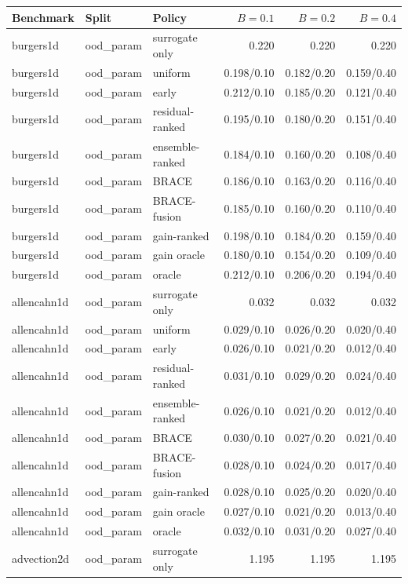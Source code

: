 \begin{tabular}{lllrrr}
\toprule
Benchmark & Split & Policy & $B=0.1$ & $B=0.2$ & $B=0.4$ \\
\midrule
burgers1d & ood\_param & surrogate only & 0.220 & 0.220 & 0.220 \\
burgers1d & ood\_param & uniform & 0.198/0.10 & 0.182/0.20 & 0.159/0.40 \\
burgers1d & ood\_param & early & 0.212/0.10 & 0.185/0.20 & 0.121/0.40 \\
burgers1d & ood\_param & residual-ranked & 0.195/0.10 & 0.180/0.20 & 0.151/0.40 \\
burgers1d & ood\_param & ensemble-ranked & 0.184/0.10 & 0.160/0.20 & 0.108/0.40 \\
burgers1d & ood\_param & BRACE & 0.186/0.10 & 0.163/0.20 & 0.116/0.40 \\
burgers1d & ood\_param & BRACE-fusion & 0.185/0.10 & 0.160/0.20 & 0.110/0.40 \\
burgers1d & ood\_param & gain-ranked & 0.198/0.10 & 0.184/0.20 & 0.159/0.40 \\
burgers1d & ood\_param & gain oracle & 0.180/0.10 & 0.154/0.20 & 0.109/0.40 \\
burgers1d & ood\_param & oracle & 0.212/0.10 & 0.206/0.20 & 0.194/0.40 \\
\midrule
allencahn1d & ood\_param & surrogate only & 0.032 & 0.032 & 0.032 \\
allencahn1d & ood\_param & uniform & 0.029/0.10 & 0.026/0.20 & 0.020/0.40 \\
allencahn1d & ood\_param & early & 0.026/0.10 & 0.021/0.20 & 0.012/0.40 \\
allencahn1d & ood\_param & residual-ranked & 0.031/0.10 & 0.029/0.20 & 0.024/0.40 \\
allencahn1d & ood\_param & ensemble-ranked & 0.026/0.10 & 0.021/0.20 & 0.012/0.40 \\
allencahn1d & ood\_param & BRACE & 0.030/0.10 & 0.027/0.20 & 0.021/0.40 \\
allencahn1d & ood\_param & BRACE-fusion & 0.028/0.10 & 0.024/0.20 & 0.017/0.40 \\
allencahn1d & ood\_param & gain-ranked & 0.028/0.10 & 0.025/0.20 & 0.020/0.40 \\
allencahn1d & ood\_param & gain oracle & 0.027/0.10 & 0.021/0.20 & 0.013/0.40 \\
allencahn1d & ood\_param & oracle & 0.032/0.10 & 0.031/0.20 & 0.027/0.40 \\
\midrule
advection2d & ood\_param & surrogate only & 1.195 & 1.195 & 1.195 \\

\end{tabular}
